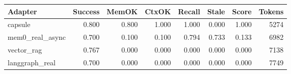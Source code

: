 \begin{tabular}{lrrrrrrr}
\hline
Adapter & Success & MemOK & CtxOK & Recall & Stale & Score & Tokens \\
\hline
capsule & 0.800 & 0.800 & 1.000 & 1.000 & 0.000 & 1.000 & 5274 \\
mem0\_real\_async & 0.700 & 0.100 & 0.100 & 0.794 & 0.733 & 0.133 & 6982 \\
vector\_rag & 0.767 & 0.000 & 0.000 & 0.000 & 0.000 & 0.000 & 7138 \\
langgraph\_real & 0.700 & 0.000 & 0.000 & 0.000 & 0.000 & 0.000 & 7749 \\
\hline
\end{tabular}
